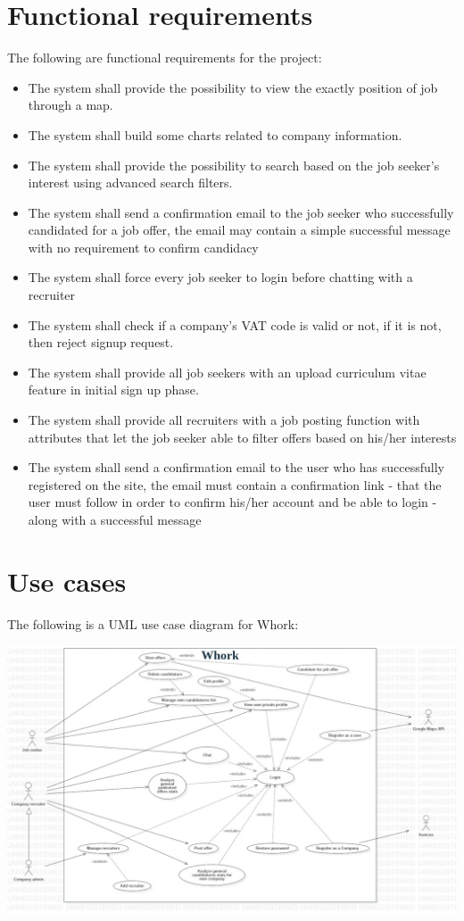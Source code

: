 \documentclass[12pt, a4paper]{article}
\begin{document}
\section{Functional requirements}
The following are functional requirements for the project:
\begin{itemize}
	\item The system shall provide the possibility to view the exactly position of job through a map.                     
	\item The system shall build some charts related to company information.                      
	\item The system shall provide the possibility to search based on the job seeker's interest using advanced search filters.
	\item The system shall send a confirmation email to the job seeker who successfully candidated for a job offer, 
		the email may contain a simple successful message with no requirement to confirm candidacy
	\item The system shall force every job seeker to login before chatting with a recruiter
	\item The system shall check if a company's VAT code is valid or not, if it is not, then reject signup request.
	\item The system shall provide all job seekers with an upload curriculum vitae feature in initial sign up phase.
	\item The system shall provide all recruiters with a job posting function with attributes that let the job seeker 
		able to filter offers based on his/her interests
	\item The system shall send a confirmation email to the user who has successfully registered on the site, 
		the email must contain a confirmation link - that the user must follow in order to confirm his/her account 
		and be able to login - along with a successful message
\end{itemize}

\section{Use cases}
The following is a UML use case diagram for Whork:

\begin{center}
	\includegraphics[scale=1.7]{diagrams/project/usecase/usecase_scaled.jpg}
\end{center}
\end{document}
